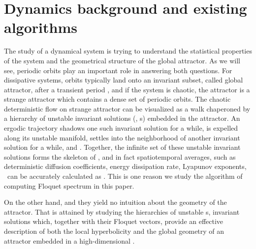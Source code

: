 \documentclass[final,leqno,onefignum,onetabnum]{siamltexmm}
\begin{document}
\section{Dynamics background and existing algorithms}
\label{sect:dynamics}

The study of a dynamical system is trying to understand
the statistical properties of the system and the geometrical structure
of the global attractor. As we will see, periodic orbits play an important
role in answering both questions. For dissipative systems,
orbits typically land onto an invariant subset, called global attractor,
after a transient period , and if the system is chaotic, the attractor is
a strange attractor which contains a dense set of
periodic orbits. The chaotic deterministic flow on strange attractor can be
visualized as a walk chaperoned by a hierarchy of unstable invariant
solutions (\eqva, \po s) embedded in the attractor. An
ergodic trajectory shadows one such invariant solution for a while, is
expelled along its unstable manifold, settles into the neighborhood of
another invariant solution for a while, and .
Together, the infinite set of these unstable invariant solutions forms
the skeleton of , and in fact spatiotemporal averages,
such as deterministic diffusion coefficients, energy dissipation rate,
Lyapunov exponents, \etc\ can be
accurately calculated as .
This is one reason we study
the algorithm of computing Floquet spectrum in this paper.

On the other hand,  and they yield no
intuition about the geometry of the attractor. That is attained by
studying the hierarchies of unstable \po s, invariant solutions which,
together with their Floquet vectors, provide an effective description  of
both the local hyperbolicity and the global geometry of an attractor
embedded in a high-dimensional \statesp.
\end{document}
